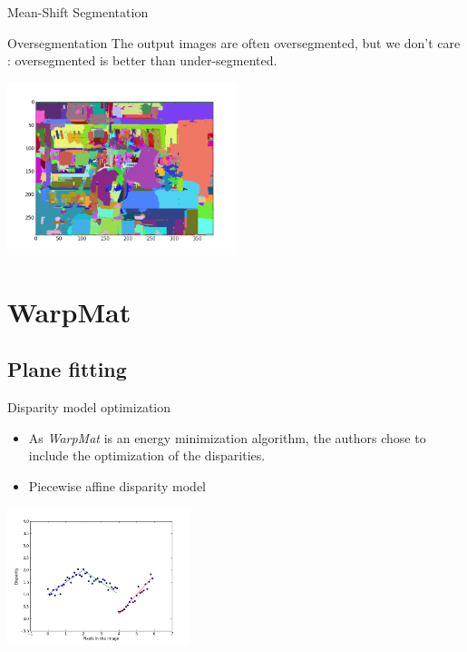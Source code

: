 \documentclass[12pt]{beamer}
\begin{document}
\begin{frame}{Mean-Shift Segmentation}
  \begin{block}{Oversegmentation}
    The output images are often oversegmented, but we don't care : oversegmented is better than under-segmented.
  \end{block}

  \begin{center}
    \includegraphics[height=5cm]{../images/Segmentation-Labels.png}
  \end{center}
\end{frame}

\section{WarpMat}
\subsection{Plane fitting}

\begin{frame}
  \begin{block}{Disparity model optimization}
    \begin{itemize}
      \item As \emph{WarpMat} is an energy minimization algorithm, the authors chose to include the optimization of the disparities.
      \item Piecewise affine disparity model
    \end{itemize}
  \end{block}

  \begin{center}
    \includegraphics[height=4cm]{../images/Disparity-PlaneModels.png}
  \end{center}
\end{frame}
\end{document}
